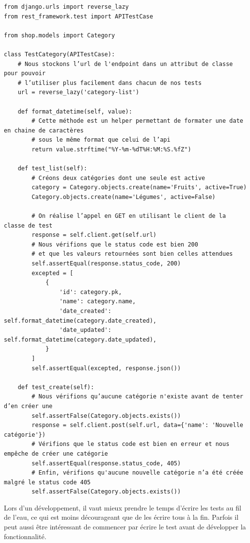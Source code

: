 \begin{verbatim}
from django.urls import reverse_lazy
from rest_framework.test import APITestCase

from shop.models import Category

class TestCategory(APITestCase):
    # Nous stockons l’url de l'endpoint dans un attribut de classe pour pouvoir
    # l’utiliser plus facilement dans chacun de nos tests
    url = reverse_lazy('category-list')

    def format_datetime(self, value):
        # Cette méthode est un helper permettant de formater une date en chaine de caractères 
        # sous le même format que celui de l’api
        return value.strftime("%Y-%m-%dT%H:%M:%S.%fZ")

    def test_list(self):
        # Créons deux catégories dont une seule est active
        category = Category.objects.create(name='Fruits', active=True)
        Category.objects.create(name='Légumes', active=False)

        # On réalise l’appel en GET en utilisant le client de la classe de test
        response = self.client.get(self.url)
        # Nous vérifions que le status code est bien 200
        # et que les valeurs retournées sont bien celles attendues
        self.assertEqual(response.status_code, 200)
        excepted = [
            {
                'id': category.pk,
                'name': category.name,
                'date_created': self.format_datetime(category.date_created),
                'date_updated': self.format_datetime(category.date_updated),
            }
        ]
        self.assertEqual(excepted, response.json())

    def test_create(self):
        # Nous vérifions qu’aucune catégorie n'existe avant de tenter d’en créer une
        self.assertFalse(Category.objects.exists())
        response = self.client.post(self.url, data={'name': 'Nouvelle catégorie'})
        # Vérifions que le status code est bien en erreur et nous empêche de créer une catégorie
        self.assertEqual(response.status_code, 405)
        # Enfin, vérifions qu'aucune nouvelle catégorie n’a été créée malgré le status code 405
        self.assertFalse(Category.objects.exists())
\end{verbatim}

\begin{theorem}
Lors d’un développement, il vaut mieux prendre le temps d’écrire les tests au fil de l’eau, ce qui est moins décourageant que de les écrire tous à la fin. Parfois il peut aussi être intéressant de commencer par écrire le test avant de développer la fonctionnalité.
\end{theorem}
